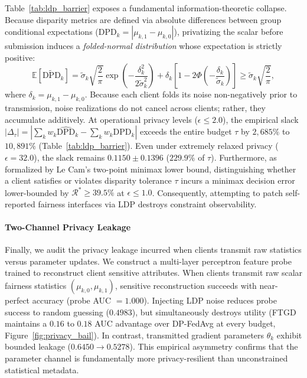 Table~\ref{tab:ldp_barrier} exposes a fundamental information-theoretic collapse. Because disparity metrics are defined via absolute differences between group conditional expectations ($\text{DPD}_k = |\mu_{k,1} - \mu_{k,0}|$), privatizing the scalar before submission induces a \textit{folded-normal distribution} whose expectation is strictly positive:
\begin{equation}
    \mathbb{E}[\widetilde{\text{DPD}}_k] = \tilde{\sigma}_k \sqrt{\frac{2}{\pi}} \exp\left(-\frac{\delta_k^2}{2\tilde{\sigma}_k^2}\right) + \delta_k \left[1 - 2\Phi\left(-\frac{\delta_k}{\tilde{\sigma}_k}\right)\right] \ge \tilde{\sigma}_k \sqrt{\frac{2}{\pi}},
\end{equation}
where $\delta_k = \mu_{k,1} - \mu_{k,0}$. Because each client folds its noise non-negatively prior to transmission, noise realizations do not cancel across clients; rather, they accumulate additively. At operational privacy levels ($\epsilon \le 2.0$), the empirical slack $|\Delta_\tau| = |\sum_k w_k \widehat{\text{DPD}}_k - \sum_k w_k \text{DPD}_k|$ exceeds the entire budget $\tau$ by $2{,}685\%$ to $10{,}891\%$ (Table~\ref{tab:ldp_barrier}). Even under extremely relaxed privacy ($\epsilon = 32.0$), the slack remains $0.1150 \pm 0.1396$ ($229.9\%$ of $\tau$). Furthermore, as formalized by Le Cam's two-point minimax lower bound, distinguishing whether a client satisfies or violates disparity tolerance $\tau$ incurs a minimax decision error lower-bounded by $\mathcal{R}^* \ge 39.5\%$ at $\epsilon \le 1.0$. Consequently, attempting to patch self-reported fairness interfaces via LDP destroys constraint observability.

\paragraph{Two-Channel Privacy Leakage}
Finally, we audit the privacy leakage incurred when clients transmit raw statistics versus parameter updates. We construct a multi-layer perceptron feature probe trained to reconstruct client sensitive attributes. When clients transmit raw scalar fairness statistics $(\mu_{k,0}, \mu_{k,1})$, sensitive reconstruction succeeds with near-perfect accuracy (probe AUC $= 1.000$). Injecting LDP noise reduces probe success to random guessing ($0.4983$), but simultaneously destroys utility (FTGD maintains a $0.16$ to $0.18$ AUC advantage over DP-FedAvg at every budget, Figure~\ref{fig:privacy_bail}). In contrast, transmitted gradient parameters $\theta_k$ exhibit bounded leakage ($0.6450 \to 0.5278$). This empirical asymmetry confirms that the parameter channel is fundamentally more privacy-resilient than unconstrained statistical metadata.

